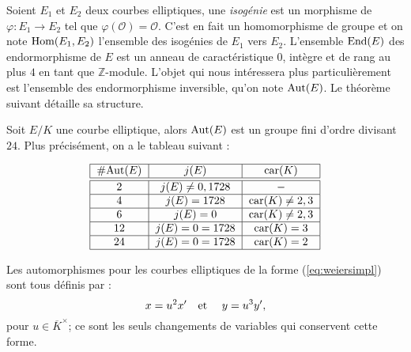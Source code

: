 \documentclass[a4paper]{article} %
\numberwithin{section}{part}
\numberwithin{equation}{section}
\newcommand\ZZ{\mathbb{Z}}
\newcommand\EO{\mathcal{O}}
\newcommand\etmath{\textup{\quad et \quad}}
\begin{document}
Soient $E_1$ et $E_2$ deux courbes elliptiques, une \emph{isogénie} est un
morphisme de $\varphi : E_1 \rightarrow E_2$ tel que $\varphi(\EO) = \EO$. C'est
en fait un homomorphisme de groupe et on note $\textup{Hom}(E_1, E_2)$
l'ensemble des isogénies de $E_1$ vers $E_2$. L'ensemble $\textup{End}(E)$ des
endormorphisme de $E$ est un anneau de caractéristique $0$, intègre et de rang
au plus $4$ en tant que $\ZZ$-module. L'objet qui nous intéressera plus
particulièrement est l'ensemble des endormorphisme inversible, qu'on note
$\textup{Aut}(E)$. Le théorème suivant détaille sa structure.
\begin{thm}
\label{th:autell}
Soit $E/K$ une courbe elliptique, alors $\textup{Aut}(E)$ est un groupe fini
d'ordre divisant $24$. Plus précisément, on a le tableau suivant :

\begin{equation}
\begin{tabular}{|c|c|c|}
    \hline
    \#Aut$(E)$ & $j(E)$ & car$(K)$\\
    \hline\hline
    $2$ & $j(E)\neq0,1728$ & $-$\\
    \hline
    $4$ & $j(E) = 1728$ & car$(K)\neq 2, 3$\\
    \hline
    $6$ & $j(E) = 0$ & car$(K)\neq 2, 3$\\
    \hline
    $12$ & $j(E) = 0 = 1728$ & car$(K) = 3$\\
    \hline
    $24$ & $j(E) = 0 = 1728$ & car$(K) = 2$\\
    \hline
\end{tabular}
\end{equation}
\end{thm}
Les automorphismes pour les courbes elliptiques de la forme
(\ref{eq:weiersimpl}) sont tous définis par : 
\begin{equation}
x = u^2x'\etmath y = u^3y',
\end{equation}
pour $u\in\overline{K}^{\times}$; ce sont les seuls changements de variables qui
conservent cette forme.
\end{document}
